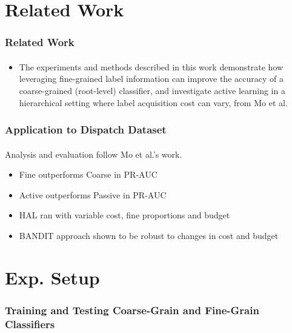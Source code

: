 \documentclass{beamer}
\begin{document}
\section{Related Work}
\begin{frame}
    \frametitle{Related Work}
    \framesubtitle{}
    \begin{itemize}
      \item The experiments and methods described in this work
demonstrate how leveraging fine-grained label  information
can improve the accuracy of a coarse-grained (root-level) classifier, and
 investigate active learning in a hierarchical setting where
 label acquisition cost can vary, from Mo et al.
    \end{itemize}
\end{frame}
\begin{frame}
    \frametitle{Application to Dispatch Dataset}
    \framesubtitle{}
    \par Analysis and evaluation follow Mo et al.'s work.
    \begin{itemize}
      \item Fine outperforms Coarse in PR-AUC
      \item Active outperforms Passive in PR-AUC
      \item HAL ran with variable cost, fine proportions and budget
      \item BANDIT approach shown to be robust to changes in cost and budget
    \end{itemize}
\end{frame}








\section{Exp. Setup}
\begin{frame}
    \frametitle{Training and Testing Coarse-Grain and Fine-Grain Classifiers}
    \framesubtitle{}
\end{frame}
\end{document}
